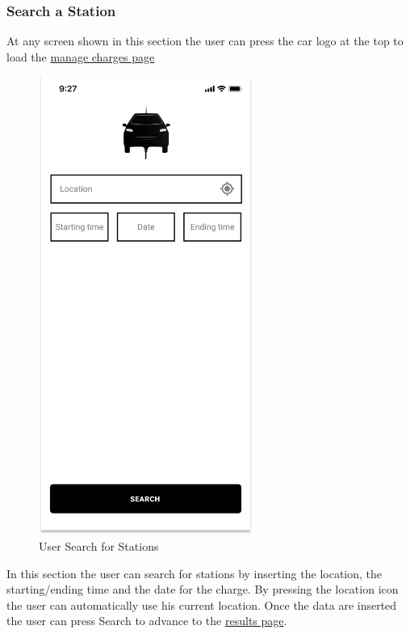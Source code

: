 \subsubsection{Search a Station}
At any screen shown in this section the user can press the car logo at the top to load the \hyperref[fig:myCharges]{manage charges page}
\begin{figure}[H]
    \centering
    \includegraphics[keepaspectratio, height=15cm]{Mockup/UserAppInterface/Station Search.png}
    \caption{User Search for Stations}
    \label{fig:Search}
\end{figure}
In this section the user can search for stations by inserting the location, the starting/ending time and the date for the charge. By pressing the location icon the user can automatically use his current location.
Once the data are inserted the user can press Search to advance to the \hyperref[fig:Results]{results page}.
